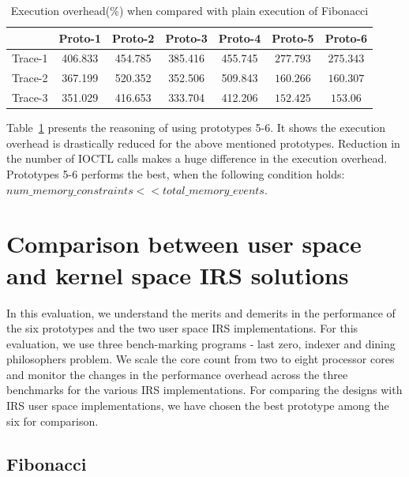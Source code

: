 \begin{table}[h]
\begin{center}
 \begin{tabular}{|c c c c c c c|} 
 \hline
 & Proto-1 & Proto-2 & Proto-3 & Proto-4 & Proto-5 & Proto-6\\ %
 \hline
 Trace-1 & 406.833 & 454.785 & 385.416 & 455.745 & $277.793$ & $275.343$ \\ 
 Trace-2 & 367.199 & 520.352 & 352.506 & 509.843 & $160.266$ & $160.307$ \\
 Trace-3 & 351.029 & 416.653 & 333.704 & 412.206 & $152.425$ & $153.06$\\
 \hline
\end{tabular}
\end{center}
\caption{Execution overhead(\%) when compared with plain execution of Fibonacci}
\label{fib_exec_over}
\end{table}

Table~\ref{fib_exec_over} presents the reasoning of using prototypes 5-6. 
It shows the execution overhead is drastically reduced for the above mentioned prototypes. 
Reduction in the number of IOCTL calls makes a huge difference in the execution overhead. 
Prototypes 5-6 performs the best, when the following condition holds:
$num\_memory\_constraints << total\_memory\_events$.

\section{Comparison between user space and kernel space IRS solutions}

In this evaluation, we understand the merits and demerits in the performance of the six prototypes and the two user space IRS implementations. 
For this evaluation, we use three bench-marking programs - last zero, indexer and dining philosophers problem. 
We scale the core count from two to eight processor cores and monitor the changes in the performance overhead across the three benchmarks for the various IRS implementations. 
For comparing the designs with IRS user space implementations, we have chosen the best prototype among the six for comparison. 

\subsection{Fibonacci}


